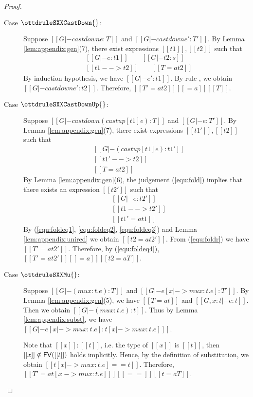 \begin{proof}
\begin{description}
        \item[Case $\ottdruleSXXCastDown{}$:] $\quad$ \\
        Suppose $[[G |- castdown e :T]]$ and $[[G |- castdown e' :T']]$. By Lemma \ref{lem:appendix:gen}(7), there exist expressions $[[t1]], [[t2]]$ such that 
        \begin{align*}
            &[[G |- e:t1]] \qquad [[G |- t2:s]] \\
            &[[t1 --> t2]] \qquad [[T =a t2 ]]
        \end{align*}
        By induction hypothesis, we have $[[G |- e':t1]]$. By rule , we obtain $[[G |- castdown e' : t2 ]]$. Therefore, $[[T' =a t2]] [[=a]] [[T]]$.
        
        \item[Case $\ottdruleSXXCastDownUp{}$:] $\quad$ \\
        Suppose $[[G |- castdown (castup [t1] e) :T]]$ and $[[G |- e :T']]$. By Lemma \ref{lem:appendix:gen}(7), there exist expressions $[[t1']], [[t2]]$ such that 
        \begin{align}
            &[[G |- (castup [t1] e):t1']] \label{equ:fold} \\
            &[[t1' --> t2]] \label{equ:foldeq1} \\
            &[[T =a t2 ]] \label{equ:foldeq4}
        \end{align}
        By Lemma \ref{lem:appendix:gen}(6), the judgement (\ref{equ:fold}) implies that there exists an expression $[[t2']]$ such that
        \begin{align}
            &[[G |- e:t2']] \label{equ:foldr} \\
            &[[t1 --> t2']] \label{equ:foldeq2} \\
            &[[t1' =a t1]] \label{equ:foldeq3}
        \end{align}
        By (\ref{equ:foldeq1}, \ref{equ:foldeq2}, \ref{equ:foldeq3}) and Lemma \ref{lem:appendix:unired} we obtain $[[t2 =a t2']]$. From (\ref{equ:foldr}) we have $[[T' =a t2' ]]$. Therefore, by (\ref{equ:foldeq4}), $[[T' =a t2' ]] [[=a]] [[t2 =a T]]$.
        
        \item[Case $\ottdruleSXXMu{}$:] $\quad$ \\
        Suppose $[[G |- (mu x:t.e) :T]]$ and $[[G |- e[x |-> mu x:t.e] :T']]$. By Lemma \ref{lem:appendix:gen}(5), we have $[[T =a t]]$ and $[[G, x:t |- e:t]]$. Then we obtain $[[G |- (mu x:t.e) : t]]$. Thus by Lemma \ref{lem:appendix:subst}, we have $[[G |- e[x |-> mu x:t.e] : t[x |-> mu x:t.e] ]]$.
        
        Note that $[[x]]:[[t]]$, i.e. the type of $[[x]]$ is $[[t]]$, then $[[x]] \notin \mathsf{FV}([[t]])$ holds implicitly. Hence, by the definition of substitution, we obtain $[[t[x |-> mu x:t.e] == t]]$. Therefore, $[[T' =a t[x |-> mu x:t.e] ]] [[==]] [[t =a T]]$.
    \end{description}
\end{proof}

